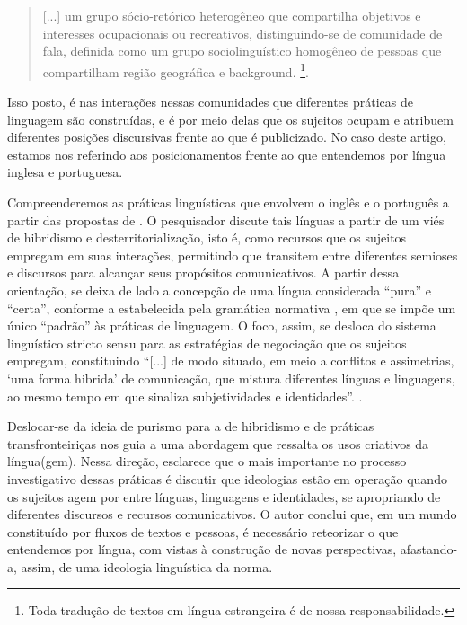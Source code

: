 \documentclass[portuguese]{textolivre}
\begin{document}
\begin{quote}
    [...] um grupo sócio-retórico heterogêneo que compartilha objetivos e interesses ocupacionais ou recreativos, distinguindo-se de comunidade de fala, definida como um grupo sociolinguístico homogêneo de pessoas que compartilham região geográfica e background. \cite[p. 08]{swales_repensando_1992}\footnote{Toda tradução de textos em língua estrangeira é de nossa responsabilidade.}.
\end{quote}

Isso posto, é nas interações nessas comunidades que diferentes práticas de linguagem são construídas, e é por meio delas que os sujeitos ocupam e atribuem diferentes posições discursivas frente ao que é publicizado. No caso deste artigo, estamos nos referindo aos posicionamentos frente ao que entendemos por língua inglesa e portuguesa.

Compreenderemos as práticas linguísticas que envolvem o inglês e o português a partir das propostas de \textcite{moita_lopes_ingles_2008,moita_lopes_ideologia_2013}. O pesquisador discute tais línguas a partir de um viés de hibridismo e desterritorialização, isto é, como recursos que os sujeitos empregam em suas interações, permitindo que transitem entre diferentes semioses e discursos para alcançar seus propósitos comunicativos. A partir dessa orientação, se deixa de lado a concepção de uma língua considerada “pura” e “certa”, conforme a estabelecida pela gramática normativa \cite{bezerra_normativismo_2016}, em que se impõe um único “padrão” às práticas de linguagem. O foco, assim, se desloca do sistema linguístico stricto sensu para as estratégias de negociação que os sujeitos empregam, constituindo “[...] de modo situado, em meio a conflitos e assimetrias, ‘uma forma hibrida’ de comunicação, que mistura diferentes línguas e linguagens, ao mesmo tempo em que sinaliza subjetividades e identidades”. \cite[p. 430]{rocha_ensino_2015}.							

Deslocar-se da ideia de purismo para a de hibridismo e de práticas transfronteiriças nos guia a uma abordagem que ressalta os usos criativos da língua(gem). Nessa direção, \textcite{moita_lopes_ideologia_2013} %
esclarece que o mais importante no processo investigativo dessas práticas é discutir que ideologias estão em operação quando os sujeitos agem por entre línguas, linguagens e identidades, se apropriando de diferentes discursos e recursos comunicativos. O autor conclui que, em um mundo constituído por fluxos de textos e pessoas, é necessário reteorizar o que entendemos por língua, com vistas à construção de novas perspectivas, afastando-a, assim, de uma ideologia linguística da norma.
\end{document}
